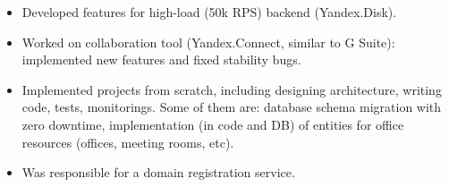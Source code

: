 \begin{itemize}
    \item Developed features for high-load (50k RPS) backend (Yandex.Disk).
    \item Worked on collaboration tool (Yandex.Connect, similar to G Suite): implemented new features and fixed stability bugs.
    \item Implemented projects from scratch, including designing architecture, writing code, tests, monitorings. Some of them are: database schema migration with zero downtime, implementation (in code and DB) of entities for office resources (offices, meeting rooms, etc).
    \item Was responsible for a domain registration service.
\end{itemize}
